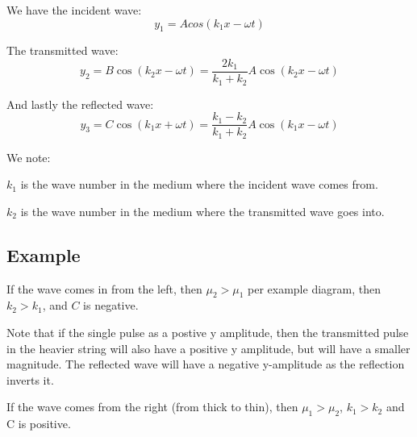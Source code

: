 We have the incident wave:
\[
    y_1 = Acos(k_1 x - \omega t)    
\]

The transmitted wave:
\[
    y_2 = B \cos(k_2 x - \omega t) = \frac{2k_1}{k_1 + k_2} A \cos(k_2 x - \omega t)
\]

And lastly the reflected wave:
\[
    y_3 = C \cos(k_1 x + \omega t) = \frac{k_1 - k_2}{k_1 + k_2} A \cos(k_1 x - \omega t)
\]


We note:

$k_1$ is the wave number in the medium where the incident wave comes from.

$k_2$ is the wave number in the medium where the transmitted wave goes into.

\subsection*{Example}
If the wave comes in from the left, then $\mu_2 > \mu_1$ per example diagram, then $k_2 > k_1$, and $C$ is negative.

Note that if the single pulse as a postive y amplitude, then the transmitted pulse in the heavier string will also have a positive y amplitude, but will have a smaller magnitude. The reflected wave will have a negative y-amplitude as the reflection inverts it.

If the wave comes from the right (from thick to thin), then $\mu_1 > \mu_2$, $k_1 > k_2$ and C is positive.